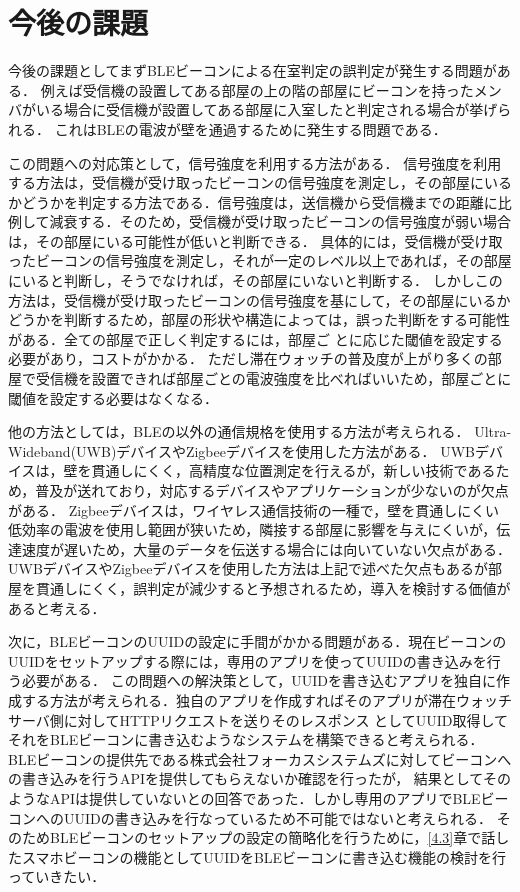 


\section{今後の課題}

今後の課題としてまずBLEビーコンによる在室判定の誤判定が発生する問題がある．
例えば受信機の設置してある部屋の上の階の部屋にビーコンを持ったメンバがいる場合に受信機が設置してある部屋に入室したと判定される場合が挙げられる．
これはBLEの電波が壁を通過するために発生する問題である．

この問題への対応策として，信号強度を利用する方法がある．
信号強度を利用する方法は，受信機が受け取ったビーコンの信号強度を測定し，その部屋にいるかどうかを判定する方法である．信号強度は，送信機から受信機までの距離に比例して減衰する．そのため，受信機が受け取ったビーコンの信号強度が弱い場合は，その部屋にいる可能性が低いと判断できる．
具体的には，受信機が受け取ったビーコンの信号強度を測定し，それが一定のレベル以上であれば，その部屋にいると判断し，そうでなければ，その部屋にいないと判断する．
しかしこの方法は，受信機が受け取ったビーコンの信号強度を基にして，その部屋にいるかどうかを判断するため，部屋の形状や構造によっては，誤った判断をする可能性がある．全ての部屋で正しく判定するには，部屋ご
とに応じた閾値を設定する必要があり，コストがかかる．
ただし滞在ウォッチの普及度が上がり多くの部屋で受信機を設置できれば部屋ごとの電波強度を比べればいいため，部屋ごとに閾値を設定する必要はなくなる．

他の方法としては，BLEの以外の通信規格を使用する方法が考えられる．
Ultra-Wideband(UWB)デバイスやZigbeeデバイスを使用した方法がある．
UWBデバイスは，壁を貫通しにくく，高精度な位置測定を行えるが，新しい技術であるため，普及が送れており，対応するデバイスやアプリケーションが少ないのが欠点がある．
Zigbeeデバイスは，ワイヤレス通信技術の一種で，壁を貫通しにくい低効率の電波を使用し範囲が狭いため，隣接する部屋に影響を与えにくいが，伝達速度が遅いため，大量のデータを伝送する場合には向いていない欠点がある．
UWBデバイスやZigbeeデバイスを使用した方法は上記で述べた欠点もあるが部屋を貫通しにくく，誤判定が減少すると予想されるため，導入を検討する価値があると考える．

次に，BLEビーコンのUUIDの設定に手間がかかる問題がある．現在ビーコンのUUIDをセットアップする際には，専用のアプリを使ってUUIDの書き込みを行う必要がある．
この問題への解決策として，UUIDを書き込むアプリを独自に作成する方法が考えられる．独自のアプリを作成すればそのアプリが滞在ウォッチサーバ側に対してHTTPリクエストを送りそのレスポンス
としてUUID取得してそれをBLEビーコンに書き込むようなシステムを構築できると考えられる．
BLEビーコンの提供先である株式会社フォーカスシステムズに対してビーコンへの書き込みを行うAPIを提供してもらえないか確認を行ったが，
結果としてそのようなAPIは提供していないとの回答であった．しかし専用のアプリでBLEビーコンへのUUIDの書き込みを行なっているため不可能ではないと考えられる．
そのためBLEビーコンのセットアップの設定の簡略化を行うために，\ref{4.3}章で話したスマホビーコンの機能としてUUIDをBLEビーコンに書き込む機能の検討を行っていきたい．

